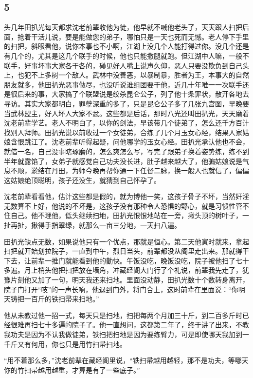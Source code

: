 {\centering\subsection{5}}

头几年田扒光每天都求沈老前辈收他为徒，他早就不喊他老头了，天天跟人扫把后面，抢着干活儿说，要是能做您的弟子，哪怕只是一天也死而无憾。老人停下手里的扫把，斜眼看他，说你本事也不小啊，江湖上没几个人能打得过你。没几个还是有几个的，尤其是这几个联手的时候，他也只能撒腿就跑。但江湖中人嘛，一般不联手，好事坏事大家各干各的，碰见好人嘴上说声久仰，恶人只要没欺负到自己头上，也犯不上多树一个敌人。武林中没善恶，以暴制暴，胜者为王，本事大的自然朋友就多，他田扒光恶事做尽，也没听说谁组团要干他，近几十年唯一一次联手还是很后来的事，大家搞了个联盟说是绞杀昆仑公子，列了他十条罪状，散开各地去寻访。其实大家都明白，罪孽深重的多了，只是昆仑公子多了几张九宫图，早晚要当武林盟主，好人坏人大家不忿。这些都是后话，那时八光还叫田扒光，天天磨着沈老前辈学艺。老人不明白了，以你的剑法，早该带几个徒弟了，怎么还千方百计找别人拜师。田扒光说以前收过一个女徒弟，合练了几个月玉女心经，结果人家姑娘含恨跳江了。沈老前辈听得起疑，问他哪学的玉女心经。田扒光承认他也不会，就借一名，自己没事瞎琢磨的，怎么爽怎么写，写完了跟弟子换着姿势练，练不到半年就露馅了，女弟子就感觉自己功夫没长进，肚子越来越大了，他骗姑娘说是气息不顺，淤结在丹田，为师今晚再帮你通一下任督二脉，换一般人也就信了，偏偏这姑娘绝顶聪明，孩子还没生，就猜到自己怀孕了。

沈老前辈看看他，估计这些都是假的，就为博他一笑，这孩子骨子不坏，当然奸淫无数算不上好，他说的不坏是，这孩子没有那种令人恐惧的野心，就是习惯性管不住自己。他不理他，低头继续扫地，田扒光恨恨地站在一旁，揪头顶的树叶子，一扯再扯，揪得手指翠绿，就那么一亩三分地，一天扫八遍。

田扒光缺点无数，如果说他只有一个优点，那就是恒心。第二天他寅时就来，拿起扫把就开始划拉院子，一直到中午，烈日当头，前辈都没从阁里走出来。那就得干下去，让前辈一推门就能看到他的勤快。午饭没吃，晚饭没吃，院子被他扫了七十多遍。月上梢头他把扫把放在墙角，冲藏经阁大门行了个礼说，前辈我先走了，犹豫片刻他又加了一句，明天我还来扫地。里面没动静，田扒光数十个数转身离开，院子门打开“吱”的一声长响，他退到门外，将门合上，这时前辈在里面说：“你明天铸把一百斤的铁扫帚来扫地。”

他从未教过他一招一式，每天只是扫地，扫把每两个月加三十斤，到二百多斤时已经很难再扫七十多遍的院子了。他一直想问，这都第二年了，终于讲了出来，不教我功夫是因为不认我做徒弟，铁扫把扫地是因为要练臂力，可是即使哪天我加到一千斤又有何用，你也只是用竹扫帚扫地。

“用不着那么多，”沈老前辈在藏经阁里说，“铁扫帚越用越轻，那不是功夫，等哪天你的竹扫帚越用越重，才算是有了一些底子。”


